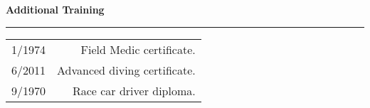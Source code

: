 %
\vspace{.5cm}
%
{\hspace{-.5cm}\textbf{Additional Training}}\vspace{.2cm}
{\color{lightgray}\hrule}
\begin{longtable}{l r}
1/1974  & \begin{minipage}[t]{0.7\textwidth}Field Medic certificate.\vspace{.5cm}\end{minipage}\\
6/2011  & \begin{minipage}[t]{0.7\textwidth}Advanced diving certificate.\vspace{.5cm}\end{minipage}\\
9/1970  & \begin{minipage}[t]{0.7\textwidth}Race car driver diploma. \vspace{.5cm}\end{minipage}\\
\end{longtable}
%
